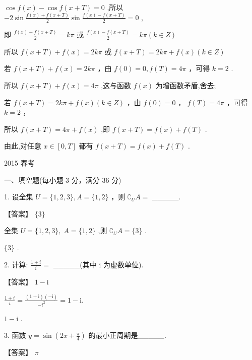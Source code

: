 \documentclass[10pt]{article}
\newcommand*\circled[1]{\tikz[baseline=(char.base)]{\node[shape=circle,draw,inner sep=1.5pt] (char) {\small #1};}}
\begin{document}
\(\cos f\left( x\right)  - \cos f\left( {x + T}\right)  = 0\) ,所以 \(- 2\sin \frac{f\left( x\right)  + f\left( {x + T}\right) }{2}\sin \frac{f\left( x\right)  - f\left( {x + T}\right) }{2} = 0\) ,

即 \(\frac{f\left( x\right)  + f\left( {x + T}\right) }{2} = {k\pi }\) 或 \(\frac{f\left( x\right)  - f\left( {x + T}\right) }{2} = {k\pi }\left( {k \in  Z}\right)\)

所以 \(f\left( {x + T}\right)  + f\left( x\right)  = {2k\pi }\) 或 \(f\left( {x + T}\right)  = {2k\pi } + f\left( x\right) \left( {k \in  Z}\right)\)

 \circled{1} 若 \(f\left( {x + T}\right)  + f\left( x\right)  = {2k\pi }\) ，由 \(f\left( 0\right)  = 0,f\left( T\right)  = {4\pi }\) ，可得 \(k = 2\) .

所以 \(f\left( {x + T}\right)  + f\left( x\right)  = {4\pi }\) ,这与函数 \(f\left( x\right)\) 为增函数矛盾,舍去;

 \circled{2} 若 \(f\left( {x + T}\right)  = {2k\pi } + f\left( x\right) \left( {k \in  Z}\right)\) ，由 \(f\left( 0\right)  = 0\) ， \(f\left( T\right)  = {4\pi }\) ，可得 \(k = 2\) ，

所以 \(f\left( {x + T}\right)  = {4\pi } + f\left( x\right)\) ,即 \(f\left( {x + T}\right)  = f\left( x\right)  + f\left( T\right)\) .

由此,对任意 \(x \in  \left\lbrack  {0,T}\right\rbrack\) 都有 \(f\left( {x + T}\right)  = f\left( x\right)  + f\left( T\right)\) .

2015 春考

一、填空题(每小题 3 分，满分 36 分)

1. 设全集 \(U = \{ 1,2,3\} ,A = \{ 1,2\}\) ，则 \({\complement }_{U}A =\) \_\_\_\_\_.

【答案】 \(\{ 3\}\)

全集 \(U = \{ 1,2,3\} ,\;A = \{ 1,2\}\) ,则 \({\complement }_{U}A = \{ 3\}\) .

\(\{ 3\}\) .

2. 计算: \(\frac{1 + i}{i} =\) \_\_\_\_\_(其中 \(\mathrm{i}\) 为虚数单位).

【答案】 \(1 - \mathrm{i}\)

\(\frac{1 + i}{i} = \frac{\left( {1 + \mathrm{i}}\right) \left( {-\mathrm{i}}\right) }{-{i}^{2}} = 1 - \mathrm{i}.\)

\(1 - \mathrm{i}\) .

3. 函数 \(y = \sin \left( {{2x} + \frac{\pi }{4}}\right)\) 的最小正周期是\_\_\_\_\_.

【答案】 \(\pi\)
\end{document}
